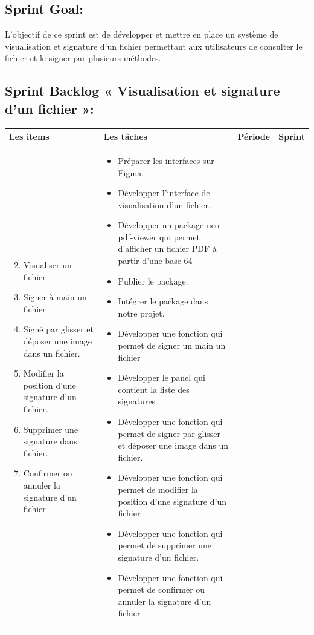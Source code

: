 \subsection{Sprint Goal:}
L'objectif de ce sprint est de développer et mettre en place un système de visualisation et signature d'un fichier permettant aux utilisateurs de consulter le fichier et le signer par plusieurs méthodes.


\subsection{Sprint Backlog « Visualisation et signature d'un fichier »:}

\begin{longtable}{|p{4cm}|p{7cm}|p{2cm}|p{2cm}|}
  \hline
  \textbf{Les items} &\textbf{Les tâches} & \textbf{Période} & \textbf{Sprint} \\
  \hline
  \vspace{-\baselineskip}
  \begin{enumerate}
    \setcounter{enumi}{1}
    \itemsep0em 
      \item Visualiser un fichier
      \item Signer à main un fichier
      \item Signé par glisser et déposer une image dans un fichier.
      \item Modifier la position d'une signature d'un fichier.
      \item Supprimer une signature dans fichier.
      \item Confirmer ou annuler la signature d'un fichier
  \end{enumerate}
  &
  \vspace{-\baselineskip}
  \begin{itemize}
    \itemsep0em 
    \item Préparer les interfaces sur Figma.
    \item Développer l'interface de visualisation d'un fichier.
    \item Développer un package neo-pdf-viewer qui permet d'afficher un fichier PDF à partir d'une base 64
    \item Publier le package.
    \item Intégrer le package dans notre projet.
    \item Développer une fonction qui permet de signer un main un fichier
    \item Développer le panel qui contient la liste des signatures
    \item Développer une fonction qui permet de signer par glisser et déposer une image dans un fichier.
    \item Développer une fonction qui permet de modifier la position d'une signature d'un fichier
    \item Développer une fonction qui permet de supprimer une signature d'un fichier.
    \item Développer une fonction qui permet de confirmer ou annuler la signature d'un fichier



\end{itemize}
\end{longtable}
